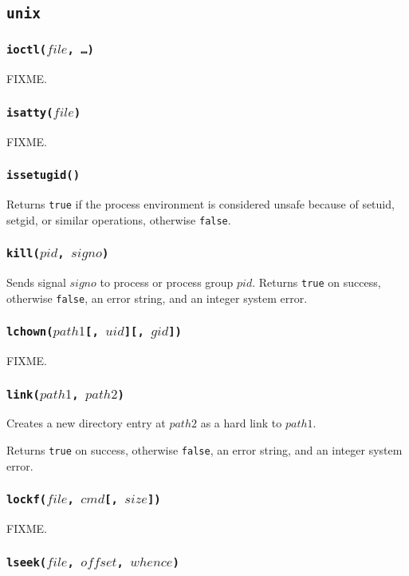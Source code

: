 \documentclass[11pt, oneside]{memoir}
\newcommand*{\true}[0]{\texttt{true}\xspace}
\newcommand*{\false}[0]{\texttt{false}\xspace}
\newcommand*{\fn}[1]{\texttt{#1}\xspace}
\newcounter{toccols}
\newenvironment{Module}[1]{
	\subsection{\texttt{#1}}
	\addtocontents{toc}{
		\protect\begin{multicols}{\value{toccols}}
	}
}{
	\addtocontents{toc}{\protect\end{multicols}}
}
\begin{document}
\begin{Module}{unix}
\subsubsection[\fn{ioctl}]{\fn{ioctl($file$, \ldots)}}

FIXME.

\subsubsection[\fn{isatty}]{\fn{isatty($file$)}}

FIXME.

\subsubsection[\fn{issetugid}]{\fn{issetugid()}}

Returns \true if the process environment is considered unsafe because of setuid, setgid, or similar operations, otherwise \false.

\subsubsection[\fn{kill}]{\fn{kill($pid$, $signo$)}}

Sends signal $signo$ to process or process group $pid$. Returns \true on success, otherwise \false, an error string, and an integer system error.

\subsubsection[\fn{lchown}]{\fn{lchown($path1$[, $uid$][, $gid$])}}

FIXME.

\subsubsection[\fn{link}]{\fn{link($path1$, $path2$)}}

Creates a new directory entry at $path2$ as a hard link to $path1$.

Returns \true on success, otherwise \false, an error string, and an integer system error. 

\subsubsection[\fn{lockf}]{\fn{lockf($file$, $cmd$[, $size$])}}

FIXME.

\subsubsection[\fn{lseek}]{\fn{lseek($file$, $offset$, $whence$)}}


\end{Module}
\end{document}

